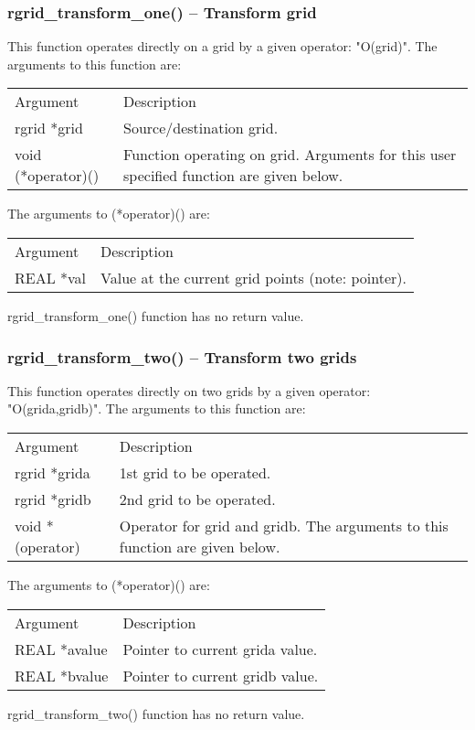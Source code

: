 \documentclass[12pt,letterpaper]{article}
\begin{document}
\subsubsection{rgrid\_transform\_one() -- Transform grid}

This function operates directly on a grid by a given operator:  "O(grid)". The arguments to this function are:
\begin{longtable}{p{} p{}}
Argument & Description\\
\cline{1-2}
rgrid *grid & Source/destination grid.\\
void (*operator)() & Function operating on grid. Arguments for this user specified function are given below.\\
\end{longtable}
The arguments to (*operator)() are:
\begin{longtable}{p{} p{}}
Argument & Description\\
\cline{1-2}
REAL *val & Value at the current grid points (note: pointer).\\
\end{longtable}
\noindent
rgrid\_transform\_one() function has no return value.

\subsubsection{rgrid\_transform\_two() -- Transform two grids}

This function operates directly on two grids by a given operator: "O(grida,gridb)". The arguments to this function are:
\begin{longtable}{p{} p{}}
Argument & Description\\
\cline{1-2}
rgrid *grida & 1st grid to be operated.\\
rgrid *gridb & 2nd grid to be operated.\\
void *(operator) & Operator for grid and gridb. The arguments to this function are given below.\\
\end{longtable}
\noindent
The arguments to (*operator)() are:
\begin{longtable}{p{} p{}}
Argument & Description\\
\cline{1-2}
REAL *avalue & Pointer to current grida value.\\
REAL *bvalue & Pointer to current gridb value.\\
\end{longtable}
\noindent
rgrid\_transform\_two() function has no return value.
\end{document}
